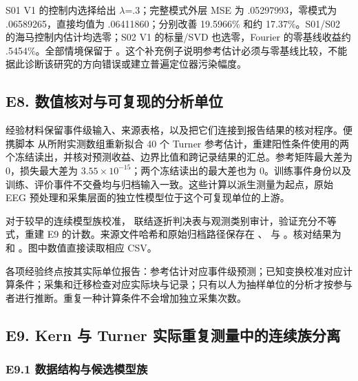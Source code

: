 \documentclass[11pt,a4paper]{article}
\begin{document}
S01 V1 的控制内选择给出 \(\lambda\)=.3；完整模式外层 MSE 为
.05297993，零模式为 .06589265，直接均值为 .06411860；分别改善 19.5966\%
和约 17.37\%。S01/S02 的海马控制内估计均选零；S02 V1 的标量/SVD
也选零，Fourier 的零基线收益约 .5454\%。全部情境保留于
。这个补充例子说明参考估计必须与零基线比较，不能据此诊断该研究的方向错误或建立普遍定位器污染幅度。

\subsection{E8.
数值核对与可复现的分析单位}\label{e8.-ux6570ux503cux6838ux5bf9ux4e0eux53efux590dux73b0ux7684ux5206ux6790ux5355ux4f4d}

经验材料保留事件级输入、来源表格，以及把它们连接到报告结果的核对程序。便携脚本
 从所附实测数组重新拟合 40
个 Turner
参考估计，重建阳性条件使用的两个冻结读出，并核对预测收益、边界比值和跨记录结果的汇总。参考矩阵最大差为
0，损失最大差为 \(3.55\times10^{-15}\)；两个冻结读出的最大差也为
0。训练事件身份以及训练、评价事件不交叠均与归档输入一致。这些计算以派生测量为起点，原始
EEG 预处理和采集层面的独立性模型位于这个可复现单位的上游。

对于较早的连续模型族校准，
联结逐折判决表与观测类别审计，验证充分不等式，重建 E9
的计数。来源文件哈希和原始归档路径保存在
、
与 。核对结果为
 和
。图中数值直接读取相应 CSV。

各项经验终点按其实际单位报告：参考估计对应事件级预测；已知变换校准对应计算条件；采集和迁移检查对应实际块与记录；只有以人为抽样单位的分析才按参与者进行推断。重复一种计算条件不会增加独立采集次数。

\subsection{E9. Kern 与 Turner
实际重复测量中的连续族分离}\label{e9.-kern-ux4e0e-turner-ux5b9eux9645ux91cdux590dux6d4bux91cfux4e2dux7684ux8fdeux7eedux65cfux5206ux79bb}

\subsubsection{E9.1
数据结构与候选模型族}\label{e9.1-ux6570ux636eux7ed3ux6784ux4e0eux5019ux9009ux6a21ux578bux65cf}
\end{document}
